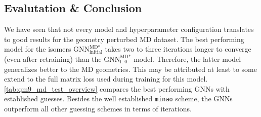 \subsection{Evalutation \& Conclusion}
\label{sec:qm9_md_isomers_conclusion}
We have seen that not every model and hyperparameter configuration translates to good results for the geometry perturbed MD dataset. The best performing model for the isomers $\text{GNN}^{\text{MD*}}_\text{initial}$ takes two to three iterations longer to converge (even after retraining) than the $\text{GNN}^{\text{MD*}}_\text{f. 0}$ model. Therefore, the latter model generalizes better to the MD geometries. This may be attributed at least to some extend to the full matrix loss used during training for this model. \\
\autoref{tab:qm9_md_test_overview} compares the best performing GNNs with established guesses. Besides the well established \texttt{minao} scheme, the GNNs outperform all other guessing schemes in terms of iterations. 
